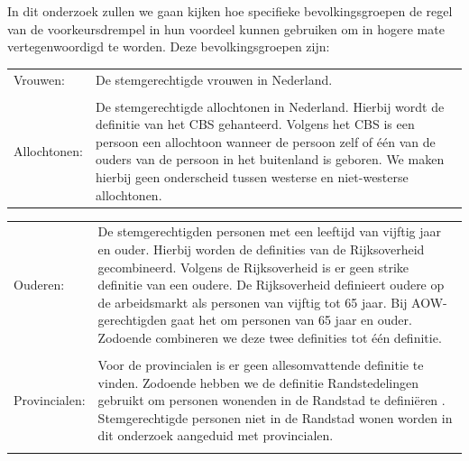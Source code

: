 In dit onderzoek zullen we gaan kijken hoe specifieke bevolkingsgroepen de regel van de voorkeursdrempel in hun voordeel kunnen gebruiken om in hogere mate vertegenwoordigd te worden. Deze bevolkingsgroepen zijn:\\

\noindent\begin{tabularx}{\textwidth}{LI}
Vrouwen: & De stemgerechtigde vrouwen in Nederland. \\
  \\
 Allochtonen: & De stemgerechtigde allochtonen in Nederland. Hierbij wordt de definitie van het CBS  \citeyearpar{Watve22:online} gehanteerd. Volgens het CBS is een persoon een allochtoon wanneer de persoon zelf of één van de ouders van de persoon in het buitenland is geboren. We maken hierbij geen onderscheid tussen westerse en niet-westerse allochtonen.
\\
\end{tabularx}
  
\noindent\begin{tabularx}{\textwidth}{LI}

  Ouderen: & De stemgerechtigden personen met een leeftijd van vijftig jaar en ouder. Hierbij worden de definities van de Rijksoverheid \citeyearpar{Wiebe32:online} gecombineerd. Volgens de Rijksoverheid is er geen strike definitie van een oudere. De Rijksoverheid definieert oudere op de arbeidsmarkt als personen van vijftig tot 65 jaar. Bij AOW-gerechtigden gaat het om personen van 65 jaar en ouder. Zodoende combineren we deze twee definities tot één definitie.  \\
\\  
Provincialen: & Voor de provincialen is er geen allesomvattende definitie te vinden. Zodoende hebben we de definitie Randstedelingen gebruikt om personen wonenden in de Randstad te defini\"{e}ren \citep{Rands36:online}. Stemgerechtigde personen niet in de Randstad wonen worden in dit onderzoek aangeduid met provincialen. \\
  \\
\end{tabularx}


